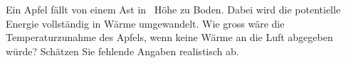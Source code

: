Ein Apfel fällt von einem Ast in \hAO\ Höhe zu Boden. Dabei wird die potentielle Energie vollständig in Wärme umgewandelt. Wie gross wäre die Temperaturzunahme des Apfels, wenn keine Wärme an die Luft abgegeben würde? Schätzen Sie fehlende Angaben realistisch ab.

